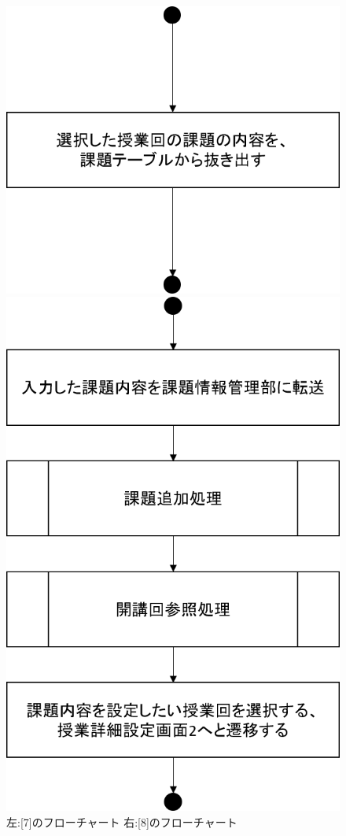 \begin{figure}[htbp]
 \begin{minipage}{0.5\hsize}
  \begin{center}
   \includegraphics[width=0.5\linewidth,clip]{./img/create_lecture/sub7.png}
  \end{center}
 \end{minipage}
 \begin{minipage}{0.5\hsize}
  \begin{center}
   \includegraphics[width=0.5\linewidth,clip]{./img/create_lecture/sub8.png}
  \end{center}
 \end{minipage}
 \caption{左:[7]のフローチャート 右:[8]のフローチャート}\label{fig:createlectureflow3}
\end{figure}

